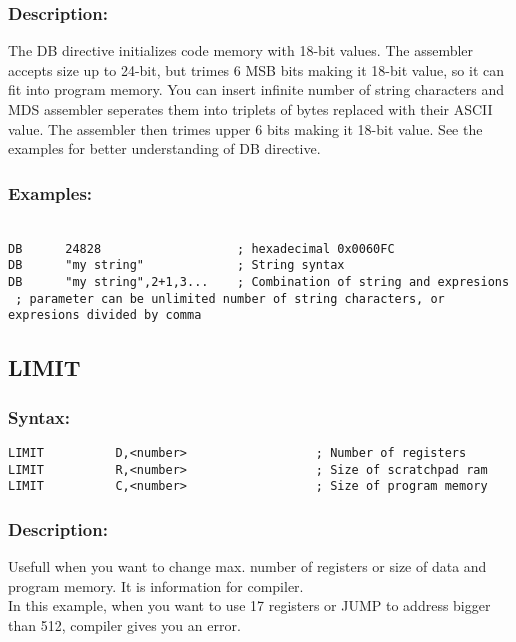         \subsubsection{Description:}
            The DB directive initializes code memory with 18-bit values. The assembler accepts size up to 24-bit, but trimes 6 MSB bits making it 18-bit value,
            so it can fit into program memory. You can insert infinite number of string characters and MDS assembler seperates them into triplets of bytes replaced
            with their ASCII value. The assembler then trimes upper 6 bits making it 18-bit value.
            See the examples for better understanding of DB directive.

        \subsubsection{Examples:}
        {
            ~\\
            \usecodefont
            \verb'DB      24828                   ; hexadecimal 0x0060FC'\\
            \verb'DB      "my string"             ; String syntax'\\
            \verb'DB      "my string",2+1,3...    ; Combination of string and expresions'\\
            \verb' ; parameter can be unlimited number of string characters, or expresions divided by comma'\\
        }
    \subsection{LIMIT}
    
        \subsubsection{Syntax:}
        \verb'LIMIT          D,<number>                  ; Number of registers '\\
        \verb'LIMIT          R,<number>                  ; Size of scratchpad ram '\\
        \verb'LIMIT          C,<number>                  ; Size of program memory '\\
        
        \subsubsection{Description:}
        Usefull when you want to change max. number of registers or size of  data and program memory. It is information for compiler.\\
        In this example, when you want to use 17 registers or JUMP to address bigger than 512, compiler gives you an error.

